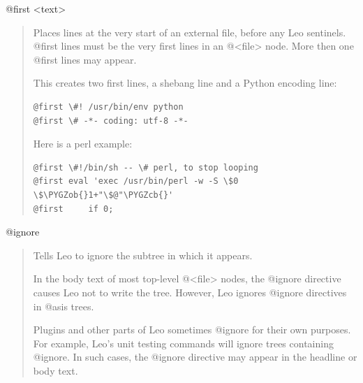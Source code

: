 \documentclass[a4paper,10pt,english]{sphinxmanual}
\def\PYGZob{\char`\{}
\def\PYGZcb{\char`\}}
\begin{document}
@first \textless{}text\textgreater{}
\begin{quote}

Places lines at the very start of an external file, before any Leo
sentinels. @first lines must be the very first lines in an @\textless{}file\textgreater{} node.
More then one @first lines may appear.

This creates two first lines, a shebang line and a Python encoding line:

\begin{Verbatim}[commandchars=\\\{\}]
@first \#! /usr/bin/env python
@first \# -*- coding: utf-8 -*-
\end{Verbatim}

Here is a perl example:

\begin{Verbatim}[commandchars=\\\{\}]
@first \#!/bin/sh -- \# perl, to stop looping
@first eval 'exec /usr/bin/perl -w -S \$0 \$\PYGZob{}1+"\$@"\PYGZcb{}'
@first     if 0;
\end{Verbatim}
\end{quote}

@ignore
\begin{quote}

Tells Leo to ignore the subtree in which it appears.

In the body text of most top-level @\textless{}file\textgreater{} nodes, the @ignore directive
causes Leo not to write the tree. However, Leo ignores @ignore directives
in @asis trees.

Plugins and other parts of Leo sometimes @ignore for their own purposes. For
example, Leo's unit testing commands will ignore trees containing @ignore.
In such cases, the @ignore directive may appear in the headline or body
text.
\end{quote}
\end{document}
